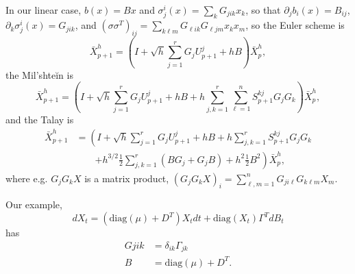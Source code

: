 \documentclass{amsart}
\def\diag{\mathrm{diag}}
\begin{document}
In our linear case, $b(x) = Bx$ and $\sigma^i_j(x) = \sum_k G_{jik} x_k$,
so that $\partial_j b_i(x) = B_{ij}$, $\partial_k \sigma^i_j(x) = G_{jik}$,
and $(\sigma \sigma^T)_{ij} = \sum_{k\ell m} G_{\ell i k} G_{\ell j m} x_k x_m$,
so the Euler scheme is
\begin{equation}
    \bar X^h_{p+1} = \left( I + \sqrt{h} \sum_{j=1}^r G_j U^j_{p+1} + h B \right) \bar X^h_p ,
\end{equation}
the Mil'shte\u{i}n is 
\begin{equation}
    \bar X^h_{p+1} = \left( I + \sqrt{h} \sum_{j=1}^r G_j U^j_{p+1} + h B
            + h \sum_{j,k=1}^r \sum_{\ell=1}^n S^{kj}_{p+1} G_j G_k \right) \bar X^h_p ,
\end{equation}
and the Talay is
\begin{equation}
 \begin{split}
    \bar X^h_{p+1} &= \left( I + \sqrt{h} \sum_{j=1}^r G_j U^j_{p+1} + h B
            + h \sum_{j,k=1}^r S^{kj}_{p+1} G_j G_k \right.  \\
        &\qquad \left. + h^{3/2} \frac12 \sum_{j,k=1}^r \left( B G_j + G_j B \right)
            + h^2 \frac12 B^2 \right) \bar X^h_p ,
 \end{split}
\end{equation}
where e.g. $G_j G_k X$ is a matrix product, $(G_j G_k X)_i = \sum_{\ell,m=1}^n G_{ji\ell} G_{k\ell m} X_m$.

Our example,
\begin{equation}
  dX_t = \left( \diag(\mu) + D^T \right) X_t dt + \diag(X_t) \Gamma^T dB_t
\end{equation}
has
\begin{align}
    G{jik} &= \delta_{ik} \Gamma_{jk} \\
    B &= \diag(\mu) + D^T  .
\end{align}
\end{document}

